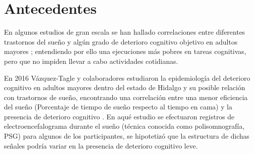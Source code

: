 
\section{Antecedentes}

En algunos estudios de gran escala se han hallado correlaciones entre diferentes trastornos del 
sueño y algún grado de deterioro cognitivo objetivo en adultos mayores 
\cite{Amer13,Miyata13,Reid06,Potvin12}; entendiendo por ello una ejecuciones más pobres en tareas
cognitivas, pero que no impiden llevar a cabo actividades cotidianas.

En 2016 Vázquez-Tagle y colaboradores estudiaron la epidemiología del deterioro cognitivo en 
adultos mayores dentro del estado de Hidalgo y su posible relación con trastornos de sueño, 
encontrando una correlación entre una menor eficiencia del sueño (Porcentaje de tiempo
de sueño respecto al tiempo en cama) y la presencia de deterioro cognitivo \cite{VazquezTagle16}.
%
En aqué estudio se efectuaron registros de electroencefalograma durante el sueño (técnica conocida
como polisomnografía, PSG) para algunos de los participantes, se hipotetizó que la estructura
de dichas señales podría variar en la presencia de deterioro cognitivo leve.


